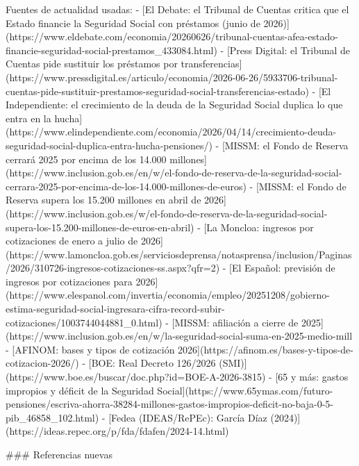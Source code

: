 \documentclass[10pt,a4paper]{article}
\begin{document}
Fuentes de actualidad usadas:
- [El Debate: el Tribunal de Cuentas critica que el Estado financie la Seguridad Social con préstamos (junio de 2026)](https://www.eldebate.com/economia/20260626/tribunal-cuentas-afea-estado-financie-seguridad-social-prestamos_433084.html)
- [Press Digital: el Tribunal de Cuentas pide sustituir los préstamos por transferencias](https://www.pressdigital.es/articulo/economia/2026-06-26/5933706-tribunal-cuentas-pide-sustituir-prestamos-seguridad-social-transferencias-estado)
- [El Independiente: el crecimiento de la deuda de la Seguridad Social duplica lo que entra en la hucha](https://www.elindependiente.com/economia/2026/04/14/crecimiento-deuda-seguridad-social-duplica-entra-hucha-pensiones/)
- [MISSM: el Fondo de Reserva cerrará 2025 por encima de los 14.000 millones](https://www.inclusion.gob.es/en/w/el-fondo-de-reserva-de-la-seguridad-social-cerrara-2025-por-encima-de-los-14.000-millones-de-euros)
- [MISSM: el Fondo de Reserva supera los 15.200 millones en abril de 2026](https://www.inclusion.gob.es/w/el-fondo-de-reserva-de-la-seguridad-social-supera-los-15.200-millones-de-euros-en-abril)
- [La Moncloa: ingresos por cotizaciones de enero a julio de 2026](https://www.lamoncloa.gob.es/serviciosdeprensa/notasprensa/inclusion/Paginas/2026/310726-ingresos-cotizaciones-ss.aspx?qfr=2)
- [El Español: previsión de ingresos por cotizaciones para 2026](https://www.elespanol.com/invertia/economia/empleo/20251208/gobierno-estima-seguridad-social-ingresara-cifra-record-subir-cotizaciones/1003744044881_0.html)
- [MISSM: afiliación a cierre de 2025](https://www.inclusion.gob.es/en/w/la-seguridad-social-suma-en-2025-medio-mill%
- [AFINOM: bases y tipos de cotización 2026](https://afinom.es/bases-y-tipos-de-cotizacion-2026/)
- [BOE: Real Decreto 126/2026 (SMI)](https://www.boe.es/buscar/doc.php?id=BOE-A-2026-3815)
- [65 y más: gastos impropios y déficit de la Seguridad Social](https://www.65ymas.com/futuro-pensiones/escriva-ahorra-38284-millones-gastos-impropios-deficit-no-baja-0-5-pib_46858_102.html)
- [Fedea (IDEAS/RePEc): García Díaz (2024)](https://ideas.repec.org/p/fda/fdafen/2024-14.html)


### Referencias nuevas
\end{document}
